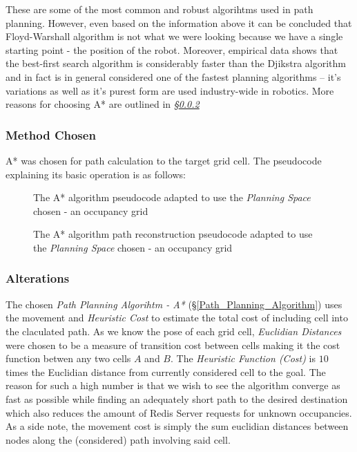 \documentclass[11pt, a4paper]{article}
\begin{document}
These are some of the most common and robust algorihtms used in path planning. However, even based on 
the information above it can be concluded that Floyd-Warshall algorithm is not what we were looking 
because we have a single starting point - the position of the robot. Moreover, empirical data 
\cite{path_efficiency} shows that the best-first search algorithm is considerably faster than 
the Djikstra algorithm and in fact is in general considered one of the fastest planning algorithms -- 
it's variations as well as it's purest form are used industry-wide in robotics. 
More reasons for choosing A* are outlined in \textit{\S\ref{Path_Planning_Algorihtm_Alterations}}

\subsubsection{Method Chosen} 

A* was chosen for path calculation to the target grid cell. The pseudocode explaining its basic operation is as follows:

\begin{figure}[H]
	  \centering 
	  \caption{The A* algorithm pseudocode\cite{path_astar_pseudocode} adapted to use the \textit{Planning Space} chosen - an occupancy grid }
\end{figure} 


\begin{figure}[H]
 	  \centering
          \caption{The A* algorithm path reconstruction pseudocode\cite{path_astar_grid_no_grid} adapted to use the \textit{Planning Space} chosen - an occupancy grid }
\end{figure} 



\subsubsection{Alterations}
\label{Path_Planning_Algorihtm_Alterations}

The chosen \textit{Path Planning Algorihtm - A*} (\S\ref{Path_Planning_Algorithm}) uses the movement 
and \textit{Heuristic Cost} to estimate the total cost of  including cell into the claculated path. 
As we know the pose of each grid cell, \textit{Euclidian Distances} were chosen to be a 
measure of transition cost between cells making it the cost function betwen any two cells $A$ and $B$. 
The \textit{Heuristic Function (Cost)} is $10$ times the Euclidian distance from currently considered 
cell to the goal. The reason for such a high number is that we wish to see the algorithm converge as 
fast as possible while finding an adequately short path to the desired destination which also reduces 
the amount of Redis Server requests for unknown occupancies. As a side note, the movement cost is 
simply the sum euclidian distances between nodes along the (considered) path involving said cell.
\end{document}
